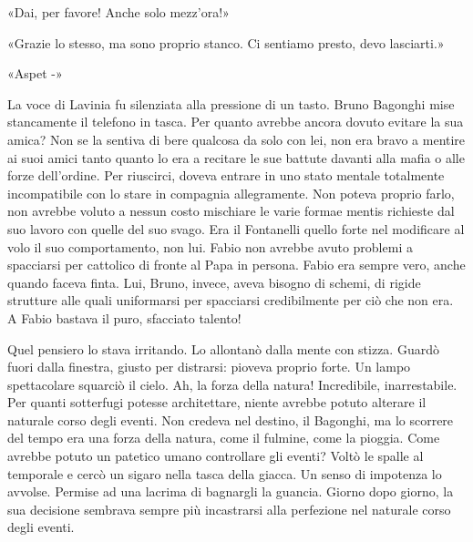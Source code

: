 «Dai, per favore! Anche solo mezz'ora!»

«Grazie lo stesso, ma sono proprio stanco. Ci sentiamo presto, devo lasciarti.»

«Aspet -»

La voce di Lavinia fu silenziata alla pressione di un tasto. Bruno Bagonghi mise stancamente il telefono in tasca. Per quanto avrebbe ancora dovuto evitare la sua amica? Non se la sentiva di bere qualcosa da solo con lei, non era bravo a mentire ai suoi amici tanto quanto lo era a recitare le sue battute davanti alla mafia o alle forze dell'ordine. Per riuscirci, doveva entrare in uno stato mentale totalmente incompatibile con lo stare in compagnia allegramente. Non poteva proprio farlo, non avrebbe voluto a nessun costo mischiare le varie formae mentis richieste dal suo lavoro con quelle del suo svago. Era il Fontanelli quello forte nel modificare al volo il suo comportamento, non lui. Fabio non avrebbe avuto problemi a spacciarsi per cattolico di fronte al Papa in persona. Fabio era sempre vero, anche quando faceva finta. Lui, Bruno, invece, aveva bisogno di schemi, di rigide strutture alle quali uniformarsi per spacciarsi credibilmente per ciò che non era. A Fabio bastava il puro, sfacciato talento!

Quel pensiero lo stava irritando. Lo allontanò dalla mente con stizza. Guardò fuori dalla finestra, giusto per distrarsi: pioveva proprio forte. Un lampo spettacolare squarciò il cielo. Ah, la forza della natura! Incredibile, inarrestabile. Per quanti sotterfugi potesse architettare, niente avrebbe potuto alterare il naturale corso degli eventi. Non credeva nel destino, il Bagonghi, ma lo scorrere del tempo era una forza della natura, come il fulmine, come la pioggia. Come avrebbe potuto un patetico umano controllare gli eventi? Voltò le spalle al temporale e cercò un sigaro nella tasca della giacca. Un senso di impotenza lo avvolse. Permise ad una lacrima di bagnargli la guancia. Giorno dopo giorno, la sua decisione sembrava sempre più incastrarsi alla perfezione nel naturale corso degli eventi.

